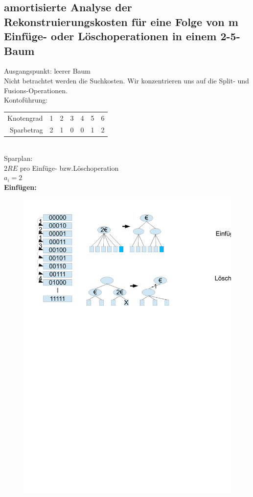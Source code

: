 \documentclass[a4paper,twoside,10pt]{report}
\begin{document}
{\subsection{amortisierte Analyse der Rekonstruierungskosten für eine Folge von m Einfüge- oder Löschoperationen in einem 2-5-Baum}
Ausgangspunkt: leerer Baum\\
Nicht betrachtet werden die Suchkosten. Wir konzentrieren uns auf die Split- und Fusions-Operationen.\\[.5em]
Kontoführung:\\
\begin{tabular}{rcccccc}
Knotengrad&1&2&3&4&5&6\\
Sparbetrag&2&1&0&0&1&2
\end{tabular}\\[.5em]
Sparplan:\\
$2RE$ pro Einfüge- bzw.Löschoperation\\
$a_i=2$\\
\textbf{Einfügen:}
\begin{figure}[H]\center
\includegraphics[trim= 6cm 24cm 6cm 1cm,clip,width=\columnwidth]{zaehler.pdf}

\end{figure}}
\end{document}
